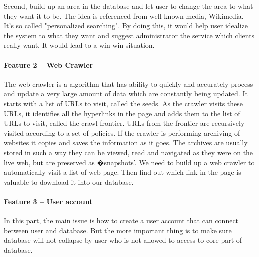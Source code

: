 \documentclass[a4paper]{article} %
\begin{document}
	Second, build up an area in the database and let user to change the area to what they want it to be. The idea is referenced from well-known media, Wikimedia. It's so called "personalized searching". By doing this, it would help user idealize the system to what they want and suggest administrator the service which clients really want. It would lead to a win-win situation.
	
	\paragraph*{Feature 2 -- Web Crawler}
	\label{task1:feature2}
	
	The web crawler is a algorithm that has ability to quickly and accurately process and update a very large amount of data which are constantly being updated.\cite{Liu2012} It starts with a list of URLs to visit, called the seeds. As the crawler visits these URLs, it identifies all the hyperlinks in the page and adds them to the list of URLs to visit, called the crawl frontier. URLs from the frontier are recursively visited according to a set of policies. If the crawler is performing archiving of websites it copies and saves the information as it goes. The archives are usually stored in such a way they can be viewed, read and navigated as they were on the live web, but are preserved as �snapshots'.\cite{Du2013} We need to build up a web crawler to automatically visit a list of web page. Then find out which link in the page is valuable to download it into our database. 
	
	\paragraph*{Feature 3 -- User account}
	\label{task1:feature3}
	
	In this part, the main issue is how to create a user account that can connect between user and database. But the more important thing is to make sure database will not collapse by user who is not allowed to access to core part of database.
	
\end{document}
